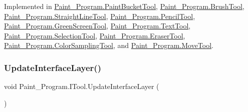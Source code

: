 Implemented in \mbox{\hyperlink{class_paint___program_1_1_paint_bucket_tool_ab2716c454849a952526e94c40bba90b6}{Paint\+\_\+\+Program.\+Paint\+Bucket\+Tool}}, \mbox{\hyperlink{class_paint___program_1_1_brush_tool_a7419f5d4bfddc97bcd3562171d6625cd}{Paint\+\_\+\+Program.\+Brush\+Tool}}, \mbox{\hyperlink{class_paint___program_1_1_straight_line_tool_aaf03af3c789ac775fef1336c81c11a34}{Paint\+\_\+\+Program.\+Straight\+Line\+Tool}}, \mbox{\hyperlink{class_paint___program_1_1_pencil_tool_a4b61261c9e375085bcbac4546a50793e}{Paint\+\_\+\+Program.\+Pencil\+Tool}}, \mbox{\hyperlink{class_paint___program_1_1_green_screen_tool_ad17100eea4bbfc96072cf4525ea053c4}{Paint\+\_\+\+Program.\+Green\+Screen\+Tool}}, \mbox{\hyperlink{class_paint___program_1_1_text_tool_a3022ee066b3c9dfdff596027c3a184ed}{Paint\+\_\+\+Program.\+Text\+Tool}}, \mbox{\hyperlink{class_paint___program_1_1_selection_tool_a3975a7e8ef98db8f1edaa5fd586fa486}{Paint\+\_\+\+Program.\+Selection\+Tool}}, \mbox{\hyperlink{class_paint___program_1_1_eraser_tool_ae7daaebe9133c249978d52183a026699}{Paint\+\_\+\+Program.\+Eraser\+Tool}}, \mbox{\hyperlink{class_paint___program_1_1_color_sampling_tool_a7f795564ca0d4df4287b2fb9a11891f4}{Paint\+\_\+\+Program.\+Color\+Sampling\+Tool}}, and \mbox{\hyperlink{class_paint___program_1_1_move_tool_a3347f2d4d15477e9c9822ea8660dfc7d}{Paint\+\_\+\+Program.\+Move\+Tool}}.

\mbox{\label{interface_paint___program_1_1_i_tool_a36db75d29e88dfd739f658633c40e955}} 
\subsubsection{\texorpdfstring{Update\+Interface\+Layer()}{UpdateInterfaceLayer()}}
{\footnotesize\ttfamily void Paint\+\_\+\+Program.\+I\+Tool.\+Update\+Interface\+Layer (\begin{DoxyParamCaption}{ }\end{DoxyParamCaption})}



